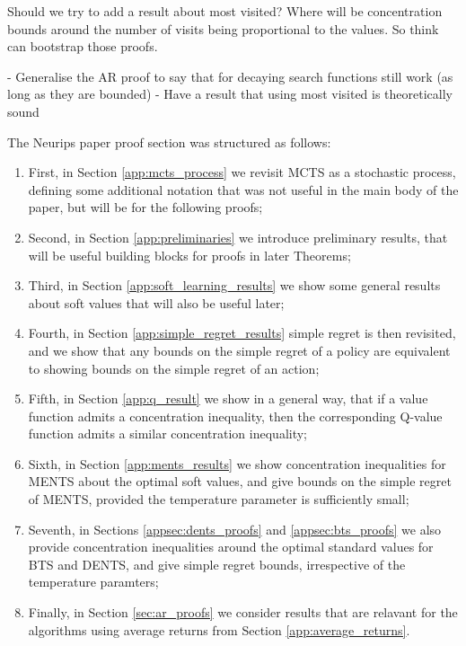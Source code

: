     Should we try to add a result about most visited? Where will be concentration bounds around the number of visits being proportional to the values. So think can bootstrap those proofs.

    - Generalise the AR proof to say that for decaying search functions still work (as long as they are bounded)
    - Have a result that using most visited is theoretically sound

    The Neurips paper proof section was structured as follows:
    \begin{enumerate}
        \item First, in Section \ref{app:mcts_process} we revisit MCTS as a stochastic process, defining some additional notation that was not useful in the main body of the paper, but will be for the following proofs;
        \item Second, in Section \ref{app:preliminaries} we introduce preliminary results, that will be useful building blocks for proofs in later Theorems;
        \item Third, in Section \ref{app:soft_learning_results} we show some general results about soft values that will also be useful later;
        \item Fourth, in Section \ref{app:simple_regret_results} simple regret is then revisited, and we show that any bounds on the simple regret of a policy are equivalent to showing bounds on the simple regret of an action;
        \item Fifth, in Section \ref{app:q_result} we show in a general way, that if a value function admits a concentration inequality, then the corresponding Q-value function admits a similar concentration inequality;
        \item Sixth, in Section \ref{app:ments_results} we show concentration inequalities for MENTS about the optimal soft values, and give bounds on the simple regret of MENTS, provided the temperature parameter is sufficiently small;
        \item Seventh, in Sections \ref{appsec:dents_proofs} and \ref{appsec:bts_proofs} we also provide concentration inequalities around the optimal standard values for BTS and DENTS, and give simple regret bounds, irrespective of the temperature paramters;
        \item Finally, in Section \ref{sec:ar_proofs} we consider results that are relavant for the algorithms using average returns from Section \ref{app:average_returns}.
    \end{enumerate}

